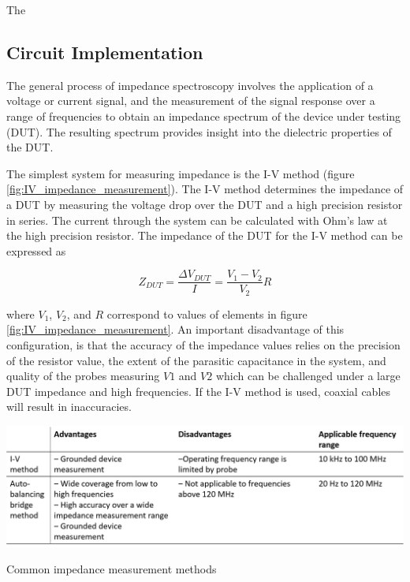 \par The 
 
 \subsection*{Circuit Implementation}
 \par The general process of impedance spectroscopy involves the application of a voltage or current signal, and the measurement of the signal response over a range of frequencies to obtain an impedance spectrum of the device under testing (DUT). The resulting spectrum provides insight into the dielectric properties of the DUT. 
 
 \par The simplest system for measuring impedance is the I-V method (figure \ref{fig:IV_impedance_measurement}). The I-V method determines the impedance of a DUT by measuring the voltage drop over the DUT and a high precision resistor in series. The current through the system can be calculated with Ohm's law at the high precision resistor. The impedance of the DUT for the I-V method can be expressed as 
 
 \begin{equation}
     Z_{DUT} = \frac{\Delta V_{DUT}}{I} = \frac{V_1 - V_2}{V_2}R
     \label{eqn:IV_Z}
 \end{equation}
 
 \noindent where $V_1$, $V_2$, and $R$ correspond to values of elements in figure \ref{fig:IV_impedance_measurement}. An important disadvantage of this configuration, is that the accuracy of the impedance values relies on the precision of the resistor value, the extent of the parasitic capacitance in the system, and quality of the probes measuring $V1$ and $V2$ which can be challenged under a large DUT impedance and high frequencies. If the I-V method is used, coaxial cables will result in inaccuracies.
 
 \begin{table}[ht]
    \centering
    \includegraphics[width=\textwidth]{images/impedanceMeasurementMethods.png}
    \caption[Common impedance measurement methods]{Common impedance measurement methods \cite{keysight_technologies_impedance_2015}}
    \label{tab:z_measurement_methods}
 \end{table}
 

